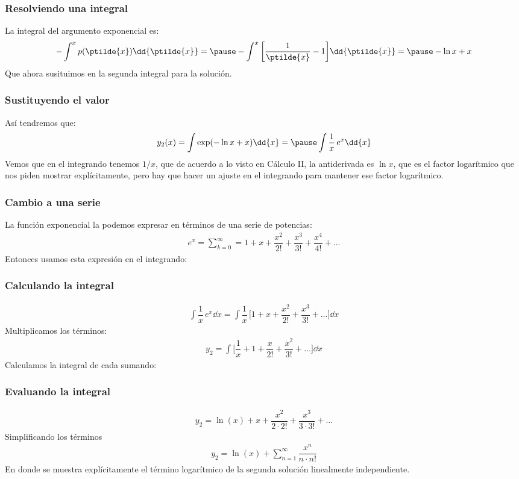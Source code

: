 \begin{frame}
\frametitle{Resolviendo una integral}
La integral del argumento exponencial es:
\begin{eqnarray*}
- \int^{x} p(\ptilde{x}) \dd{\ptilde{x}} = \pause - \int^{x} \bigg[ \dfrac{1}{\ptilde{x}} - 1 \bigg] \dd{\ptilde{x}}= \pause - \ln x + x
\end{eqnarray*}
\pause
Que ahora susituimos en la segunda integral para la solución.
\end{frame}
\begin{frame}
\frametitle{Sustituyendo el valor}
Así tendremos que:
\begin{eqnarray*}
y_{2} (x) = \int \exp(- \ln x + x ) \dd{x} = \pause \int \dfrac{1}{x} \, e^{x} \dd{x}
\end{eqnarray*}
\pause
Vemos que en el integrando tenemos $1/x$, que de acuerdo a lo visto en Cálculo II, la antiderivada es $\ln x$, que es el factor logarítmico que nos piden mostrar explícitamente, pero hay que hacer un ajuste en el integrando para mantener ese factor logarítmico.
\end{frame}
\begin{frame}
\frametitle{Cambio a una serie}
La función exponencial la podemos expresar en términos de una serie de potencias:
\begin{align*}
e^{x} = \sum_{k=0}^{\infty} =  1 + x + \dfrac{x^{2}}{2!} + \dfrac{x^{3}}{3!} + \dfrac{x^{4}}{4!} + \ldots
\end{align*}
\pause
Entonces usamos esta expresión en el integrando:
\end{frame}
\begin{frame}
\frametitle{Calculando la integral}
\begin{align*}
\int \dfrac{1}{x} \, e^{x} \dd{x} = \int \dfrac{1}{x} \, \bigg[ 1 + x + \dfrac{x^{2}}{2!} + \dfrac{x^{3}}{3!} + \ldots \bigg] \dd{x}
\end{align*}
\pause
Multiplicamos los términos:
\begin{align*}
y_{2} = \int \bigg[ \dfrac{1}{x} + 1 + \dfrac{x}{2!} + \dfrac{x^{2}}{3!} + \ldots \bigg] \dd{x}
\end{align*}
Calculamos la integral de cada sumando:
\end{frame}
\begin{frame}
\frametitle{Evaluando la integral}
\begin{align*}
y_{2} =  \ln (x) + x + \dfrac{x^{2}}{2 \cdot 2!} + \dfrac{x^{3}}{3 \cdot 3!} + \ldots
\end{align*}
\pause
Simplificando los términos
\begin{align*}
y_{2} =  \ln (x) + \sum_{n=1}^{\infty} \dfrac{x^{n}}{n \cdot n!}
\end{align*}
En donde se muestra explícitamente el término logarítmico de la segunda solución linealmente independiente.
\end{frame}
